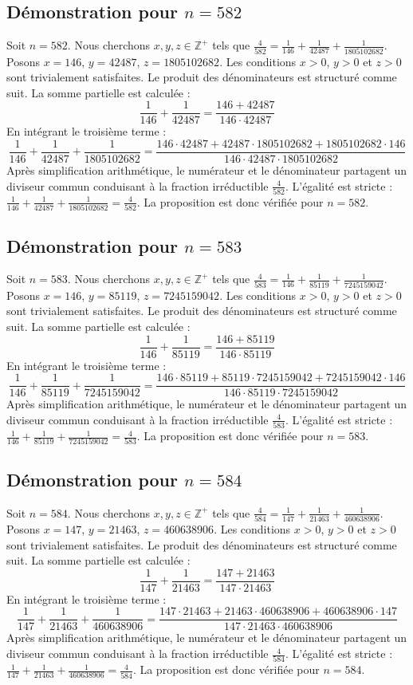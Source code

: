 \documentclass[11pt,a4paper]{article}
\begin{document}
\subsection{Démonstration pour $n = 582$}
Soit $n = 582$. Nous cherchons $x, y, z \in \mathbb{Z}^{+}$ tels que $\frac{4}{582} = \frac{1}{146} + \frac{1}{42487} + \frac{1}{1805102682}$.
Posons $x = 146$, $y = 42487$, $z = 1805102682$.
Les conditions $x > 0$, $y > 0$ et $z > 0$ sont trivialement satisfaites.
Le produit des dénominateurs est structuré comme suit. La somme partielle est calculée :
$$ \frac{1}{146} + \frac{1}{42487} = \frac{146+42487}{146 \cdot 42487} $$
En intégrant le troisième terme :
$$ \frac{1}{146} + \frac{1}{42487} + \frac{1}{1805102682} = \frac{146 \cdot 42487 + 42487 \cdot 1805102682 + 1805102682 \cdot 146}{146 \cdot 42487 \cdot 1805102682} $$
Après simplification arithmétique, le numérateur et le dénominateur partagent un diviseur commun conduisant à la fraction irréductible $\frac{4}{582}$.
L'égalité est stricte : $\frac{1}{146} + \frac{1}{42487} + \frac{1}{1805102682} = \frac{4}{582}$.
La proposition est donc vérifiée pour $n = 582$.
\subsection{Démonstration pour $n = 583$}
Soit $n = 583$. Nous cherchons $x, y, z \in \mathbb{Z}^{+}$ tels que $\frac{4}{583} = \frac{1}{146} + \frac{1}{85119} + \frac{1}{7245159042}$.
Posons $x = 146$, $y = 85119$, $z = 7245159042$.
Les conditions $x > 0$, $y > 0$ et $z > 0$ sont trivialement satisfaites.
Le produit des dénominateurs est structuré comme suit. La somme partielle est calculée :
$$ \frac{1}{146} + \frac{1}{85119} = \frac{146+85119}{146 \cdot 85119} $$
En intégrant le troisième terme :
$$ \frac{1}{146} + \frac{1}{85119} + \frac{1}{7245159042} = \frac{146 \cdot 85119 + 85119 \cdot 7245159042 + 7245159042 \cdot 146}{146 \cdot 85119 \cdot 7245159042} $$
Après simplification arithmétique, le numérateur et le dénominateur partagent un diviseur commun conduisant à la fraction irréductible $\frac{4}{583}$.
L'égalité est stricte : $\frac{1}{146} + \frac{1}{85119} + \frac{1}{7245159042} = \frac{4}{583}$.
La proposition est donc vérifiée pour $n = 583$.
\subsection{Démonstration pour $n = 584$}
Soit $n = 584$. Nous cherchons $x, y, z \in \mathbb{Z}^{+}$ tels que $\frac{4}{584} = \frac{1}{147} + \frac{1}{21463} + \frac{1}{460638906}$.
Posons $x = 147$, $y = 21463$, $z = 460638906$.
Les conditions $x > 0$, $y > 0$ et $z > 0$ sont trivialement satisfaites.
Le produit des dénominateurs est structuré comme suit. La somme partielle est calculée :
$$ \frac{1}{147} + \frac{1}{21463} = \frac{147+21463}{147 \cdot 21463} $$
En intégrant le troisième terme :
$$ \frac{1}{147} + \frac{1}{21463} + \frac{1}{460638906} = \frac{147 \cdot 21463 + 21463 \cdot 460638906 + 460638906 \cdot 147}{147 \cdot 21463 \cdot 460638906} $$
Après simplification arithmétique, le numérateur et le dénominateur partagent un diviseur commun conduisant à la fraction irréductible $\frac{4}{584}$.
L'égalité est stricte : $\frac{1}{147} + \frac{1}{21463} + \frac{1}{460638906} = \frac{4}{584}$.
La proposition est donc vérifiée pour $n = 584$.
\end{document}
